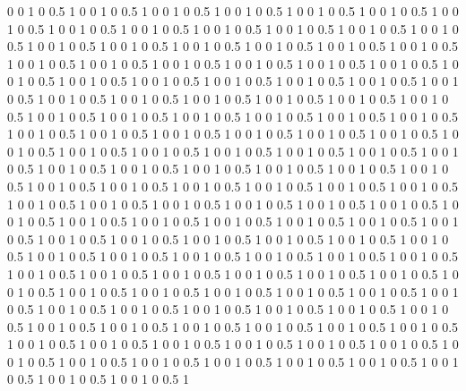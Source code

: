 0 0 1 0 0.5 1
0 0 1 0 0.5 1
0 0 1 0 0.5 1
0 0 1 0 0.5 1
0 0 1 0 0.5 1
0 0 1 0 0.5 1
0 0 1 0 0.5 1
0 0 1 0 0.5 1
0 0 1 0 0.5 1
0 0 1 0 0.5 1
0 0 1 0 0.5 1
0 0 1 0 0.5 1
0 0 1 0 0.5 1
0 0 1 0 0.5 1
0 0 1 0 0.5 1
0 0 1 0 0.5 1
0 0 1 0 0.5 1
0 0 1 0 0.5 1
0 0 1 0 0.5 1
0 0 1 0 0.5 1
0 0 1 0 0.5 1
0 0 1 0 0.5 1
0 0 1 0 0.5 1
0 0 1 0 0.5 1
0 0 1 0 0.5 1
0 0 1 0 0.5 1
0 0 1 0 0.5 1
0 0 1 0 0.5 1
0 0 1 0 0.5 1
0 0 1 0 0.5 1
0 0 1 0 0.5 1
0 0 1 0 0.5 1
0 0 1 0 0.5 1
0 0 1 0 0.5 1
0 0 1 0 0.5 1
0 0 1 0 0.5 1
0 0 1 0 0.5 1
0 0 1 0 0.5 1
0 0 1 0 0.5 1
0 0 1 0 0.5 1
0 0 1 0 0.5 1
0 0 1 0 0.5 1
0 0 1 0 0.5 1
0 0 1 0 0.5 1
0 0 1 0 0.5 1
0 0 1 0 0.5 1
0 0 1 0 0.5 1
0 0 1 0 0.5 1
0 0 1 0 0.5 1
0 0 1 0 0.5 1
0 0 1 0 0.5 1
0 0 1 0 0.5 1
0 0 1 0 0.5 1
0 0 1 0 0.5 1
0 0 1 0 0.5 1
0 0 1 0 0.5 1
0 0 1 0 0.5 1
0 0 1 0 0.5 1
0 0 1 0 0.5 1
0 0 1 0 0.5 1
0 0 1 0 0.5 1
0 0 1 0 0.5 1
0 0 1 0 0.5 1
0 0 1 0 0.5 1
0 0 1 0 0.5 1
0 0 1 0 0.5 1
0 0 1 0 0.5 1
0 0 1 0 0.5 1
0 0 1 0 0.5 1
0 0 1 0 0.5 1
0 0 1 0 0.5 1
0 0 1 0 0.5 1
0 0 1 0 0.5 1
0 0 1 0 0.5 1
0 0 1 0 0.5 1
0 0 1 0 0.5 1
0 0 1 0 0.5 1
0 0 1 0 0.5 1
0 0 1 0 0.5 1
0 0 1 0 0.5 1
0 0 1 0 0.5 1
0 0 1 0 0.5 1
0 0 1 0 0.5 1
0 0 1 0 0.5 1
0 0 1 0 0.5 1
0 0 1 0 0.5 1
0 0 1 0 0.5 1
0 0 1 0 0.5 1
0 0 1 0 0.5 1
0 0 1 0 0.5 1
0 0 1 0 0.5 1
0 0 1 0 0.5 1
0 0 1 0 0.5 1
0 0 1 0 0.5 1
0 0 1 0 0.5 1
0 0 1 0 0.5 1
0 0 1 0 0.5 1
0 0 1 0 0.5 1
0 0 1 0 0.5 1
0 0 1 0 0.5 1
0 0 1 0 0.5 1
0 0 1 0 0.5 1
0 0 1 0 0.5 1
0 0 1 0 0.5 1
0 0 1 0 0.5 1
0 0 1 0 0.5 1
0 0 1 0 0.5 1
0 0 1 0 0.5 1
0 0 1 0 0.5 1
0 0 1 0 0.5 1
0 0 1 0 0.5 1
0 0 1 0 0.5 1
0 0 1 0 0.5 1
0 0 1 0 0.5 1
0 0 1 0 0.5 1
0 0 1 0 0.5 1
0 0 1 0 0.5 1
0 0 1 0 0.5 1
0 0 1 0 0.5 1
0 0 1 0 0.5 1
0 0 1 0 0.5 1
0 0 1 0 0.5 1
0 0 1 0 0.5 1
0 0 1 0 0.5 1
0 0 1 0 0.5 1
0 0 1 0 0.5 1
0 0 1 0 0.5 1
0 0 1 0 0.5 1
0 0 1 0 0.5 1
0 0 1 0 0.5 1
0 0 1 0 0.5 1
0 0 1 0 0.5 1
0 0 1 0 0.5 1
0 0 1 0 0.5 1
